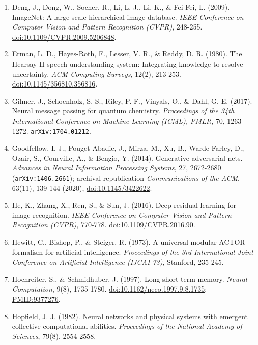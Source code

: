 \documentclass[10pt,letterpaper]{article}
\begin{document}
\begin{enumerate}
  \texttt{arXiv:2501.\allowbreak{}12948}.
\item
  Deng, J., Dong, W., Socher, R., Li, L.-J., Li, K., \& Fei-Fei, L.
  (2009). ImageNet: A large-scale hierarchical image database.
  \emph{IEEE Conference on Computer Vision and Pattern Recognition
  (CVPR)}, 248-255.
  \href{https://doi.org/10.1109/CVPR.2009.5206848}{doi:10.1109/CVPR.2009.5206848}.
\item
  Erman, L. D., Hayes-Roth, F., Lesser, V. R., \& Reddy, D. R. (1980).
  The Hearsay-II speech-understanding system: Integrating knowledge to
  resolve uncertainty. \emph{ACM Computing Surveys}, 12(2), 213-253.
  \href{https://doi.org/10.1145/356810.356816}{doi:10.1145/356810.356816}.
\item
  Gilmer, J., Schoenholz, S. S., Riley, P. F., Vinyals, O., \& Dahl, G.
  E. (2017). Neural message passing for quantum chemistry.
  \emph{Proceedings of the 34th International Conference on Machine
  Learning (ICML), PMLR}, 70, 1263-1272. \texttt{arXiv:1704.\allowbreak{}01212}.
\item
  Goodfellow, I. J., Pouget-Abadie, J., Mirza, M., Xu, B., Warde-Farley,
  D., Ozair, S., Courville, A., \& Bengio, Y. (2014). Generative
  adversarial nets. \emph{Advances in Neural Information Processing
  Systems}, 27, 2672-2680 (\texttt{arXiv:1406.\allowbreak{}2661}); archival
  republication \emph{Communications of the ACM}, 63(11), 139-144
  (2020), \href{https://doi.org/10.1145/3422622}{doi:10.1145/3422622}.
\item
  He, K., Zhang, X., Ren, S., \& Sun, J. (2016). Deep residual learning
  for image recognition. \emph{IEEE Conference on Computer Vision and
  Pattern Recognition (CVPR)}, 770-778.
  \href{https://doi.org/10.1109/CVPR.2016.90}{doi:10.1109/CVPR.2016.90}.
\item
  Hewitt, C., Bishop, P., \& Steiger, R. (1973). A universal modular
  ACTOR formalism for artificial intelligence. \emph{Proceedings of the
  3rd International Joint Conference on Artificial Intelligence
  (IJCAI-73)}, Stanford, 235-245.
\item
  Hochreiter, S., \& Schmidhuber, J. (1997). Long short-term memory.
  \emph{Neural Computation}, 9(8), 1735-1780.
  \href{https://doi.org/10.1162/neco.1997.9.8.1735}{doi:10.1162/neco.1997.9.8.1735};
  \url{PMID:9377276}.
\item
  Hopfield, J. J. (1982). Neural networks and physical systems with
  emergent collective computational abilities. \emph{Proceedings of the
  National Academy of Sciences}, 79(8), 2554-2558.

\end{enumerate}
\end{document}
